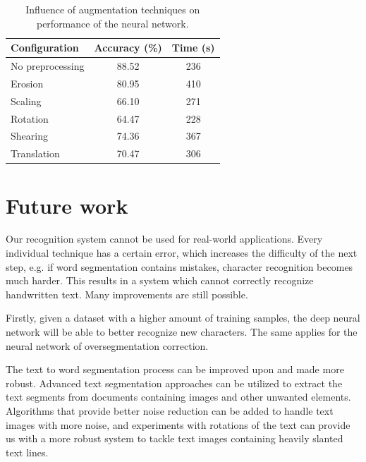 \documentclass{article}
\begin{document}
\begin{table}
\caption{Influence of augmentation techniques on performance of the neural network.}
\label{tab:preprocess}
\vskip 0.15in
\begin{center}
\begin{small}
\begin{sc}
\begin{tabular}{lcc}
\hline
\abovespace\belowspace
Configuration & Accuracy (\%) & Time (s) \\
\hline
\abovespace
No preprocessing & 88.52 & 236 \\
Erosion & 80.95 & 410 \\
Scaling & 66.10 & 271 \\
Rotation & 64.47 & 228 \\
Shearing & 74.36 & 367 \\
Translation & 70.47 & 306 \\
\hline
\end{tabular}
\end{sc}
\end{small}
\end{center}
\vskip -0.1in
\end{table}


\section{Future work}
Our recognition system cannot be used for real-world applications. Every individual technique has a certain error, which increases the difficulty of the next step, e.g. if word segmentation contains mistakes, character recognition becomes much harder.
This results in a system which cannot correctly recognize handwritten text.
Many improvements are still possible.

Firstly, given a dataset with a higher amount of training samples, the deep neural network will be able to better recognize new characters. The same applies for the neural network of oversegmentation correction.

The text to word segmentation process can be improved upon and made more robust.
Advanced text segmentation approaches can be utilized to extract the text segments from documents containing images and other unwanted elements.
Algorithms that provide better noise reduction can be added to handle text images with more noise,
and experiments with rotations of the text can provide us with a more robust system to tackle text images containing heavily slanted text lines.
\end{document}
